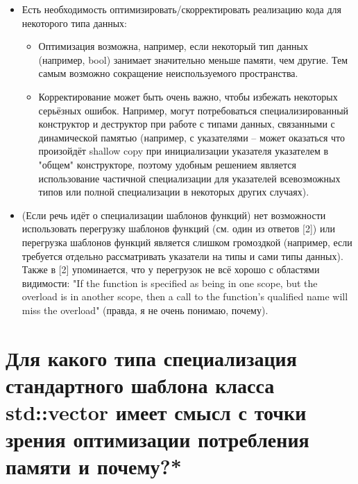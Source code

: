 \documentclass[a4paper,12pt]{article}	%
\begin{document}
	\begin{itemize}
	
		\item Есть необходимость оптимизировать/скорректировать реализацию кода для некоторого типа данных:
		
		\begin{itemize}
			
			\item Оптимизация возможна, например, если некоторый тип данных (например, bool) занимает значительно меньше памяти, чем другие. Тем самым возможно сокращение неиспользуемого пространства.			
			
			\item Корректирование может быть очень важно, чтобы избежать некоторых серьёзных ошибок. Например, могут потребоваться специализированный конструктор и деструктор при работе с типами данных, связанными с динамической памятью (например, с указателями -- может оказаться что произойдёт shallow copy при инициализации указателя указателем в "общем" конструкторе, поэтому удобным решением является использование частичной специализации для указателей всевозможных типов или полной специализации в некоторых других случаях).
		
		\end{itemize}
		
		\item (Если речь идёт о специализации шаблонов функций) нет возможности использовать перегрузку шаблонов функций (см. один из ответов [2]) или перегрузка шаблонов функций является слишком громоздкой (например, если требуется отдельно рассматривать указатели на типы и сами типы данных). Также в [2] упоминается, что у перегрузок не всё хорошо с областями видимости: "If the function is specified as being in one scope, but the overload is in another scope, then a call to the function's qualified name will miss the overload" (правда, я не очень понимаю, почему).
	
	\end{itemize}

	
\newpage

\section{Для какого типа специализация стандартного шаблона класса std::vector имеет смысл с точки зрения оптимизации потребления памяти и почему?*}
	
\end{document}

